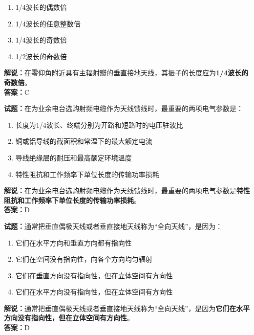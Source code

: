 \documentclass{ctexbook}
\begin{document}
\begin{enumerate}[leftmargin=3em]
	\item 1/4波长的偶数倍
	\item 1/4波长的任意整数倍
	\item 1/4波长的奇数倍
	\item 1/2波长的奇数倍
\end{enumerate}

\noindent\textbf{解说：}在零仰角附近具有主辐射瓣的垂直接地天线，其振子的长度应为\textbf{1/4波长的奇数倍}。\\\noindent\textbf{答案：}C%


\bigskip


\noindent\textbf{试题：}在为业余电台选购射频电缆作为天线馈线时，最重要的两项电气参数是：

\begin{enumerate}[leftmargin=3em]
	\item 长度为1/4波长、终端分别为开路和短路时的电压驻波比
	\item 铜或铝导线的截面积和常温下的最大额定电流
	\item 导线绝缘层的耐压和最高额定环境温度
	\item 特性阻抗和工作频率下单位长度的传输功率损耗
\end{enumerate}

\noindent\textbf{解说：}在为业余电台选购射频电缆作为天线馈线时，最重要的两项电气参数是\textbf{特性阻抗和工作频率下单位长度的传输功率损耗}。\\\noindent\textbf{答案：}D%


\bigskip


\noindent\textbf{试题：}通常把垂直偶极天线或者垂直接地天线称为“全向天线”，是因为：

\begin{enumerate}[leftmargin=3em]
	\item 它们在水平方向和垂直方向都有指向性
	\item 它们在空间没有指向性，向各个方向均匀辐射
	\item 它们在垂直方向没有指向性，但在立体空间有方向性
	\item 它们在水平方向没有指向性，但在立体空间有方向性
\end{enumerate}

\noindent\textbf{解说：}通常把垂直偶极天线或者垂直接地天线称为“全向天线”，是因为\textbf{它们在水平方向没有指向性，但在立体空间有方向性}。\\\noindent\textbf{答案：}D%


\bigskip
\end{document}
